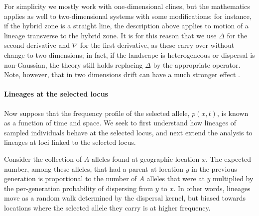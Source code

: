 \documentclass[11pt,letterpaper]{article}
\newcommand{\alisa}[1]{{\em \color{red} #1}}
\newcommand{\plr}[1]{{\em \color{blue} #1}}
\newcommand{\grad}{\nabla}
\begin{document}
For simplicity we mostly work with one-dimensional clines,
but the mathematics applies as well to two-dimensional systems with some modifications:
for instance, if the hybrid zone is a straight line, 
the description above applies to motion of a lineage transverse to the hybrid zone.  
It is for this reason that we use $\Delta$ for the second derivative and $\grad$ for the first derivative,
as these carry over without change to two dimensions;
in fact, if the landscape is heterogeneous or dispersal is non-Gaussian,
the theory still holds replacing $\Delta$ by the appropriate operator.
Note, however, that in two dimensions drift can have a much stronger effect \citep{cox1995hybrid,barton2010phylogeography,durrett2007width}.


\paragraph{Lineages at the selected locus}
Now suppose that the frequency profile of the selected allele, $p(x,t)$, is known as a function of time and space.
We seek to first understand how lineages of sampled individuals behave at the selected locus,
and next extend the analysis to lineages at loci linked to the selected locus. 

Consider the collection of $A$ alleles found at geographic location $x$.
The expected number, among these alleles, that had a parent at location $y$ in the previous generation 
is proportional to the number of $A$ alleles that were at $y$ multiplied by the per-generation probability of dispersing from $y$ to $x$. 
In other words, lineages move as a random walk determined by the dispersal kernel,
but biased towards locations where the selected allele they carry is at higher frequency.
\end{document}
